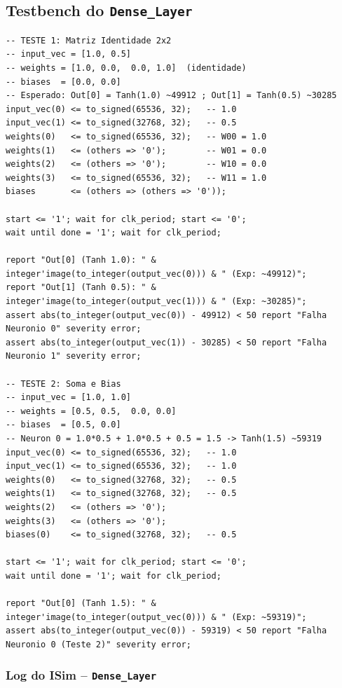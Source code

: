 \documentclass[a4paper,12pt]{article}
\begin{document}
\subsection{Testbench do \texttt{Dense\_Layer}}

\begin{lstlisting}[style=vhdlstyle,
    caption={Testbench do \texttt{Dense\_Layer} -- dois casos de valida\c{c}\~ao.},
    label={lst:tb_dense}]
-- TESTE 1: Matriz Identidade 2x2
-- input_vec = [1.0, 0.5]
-- weights = [1.0, 0.0,  0.0, 1.0]  (identidade)
-- biases  = [0.0, 0.0]
-- Esperado: Out[0] = Tanh(1.0) ~49912 ; Out[1] = Tanh(0.5) ~30285
input_vec(0) <= to_signed(65536, 32);   -- 1.0
input_vec(1) <= to_signed(32768, 32);   -- 0.5
weights(0)   <= to_signed(65536, 32);   -- W00 = 1.0
weights(1)   <= (others => '0');        -- W01 = 0.0
weights(2)   <= (others => '0');        -- W10 = 0.0
weights(3)   <= to_signed(65536, 32);   -- W11 = 1.0
biases       <= (others => (others => '0'));

start <= '1'; wait for clk_period; start <= '0';
wait until done = '1'; wait for clk_period;

report "Out[0] (Tanh 1.0): " & integer'image(to_integer(output_vec(0))) & " (Exp: ~49912)";
report "Out[1] (Tanh 0.5): " & integer'image(to_integer(output_vec(1))) & " (Exp: ~30285)";
assert abs(to_integer(output_vec(0)) - 49912) < 50 report "Falha Neuronio 0" severity error;
assert abs(to_integer(output_vec(1)) - 30285) < 50 report "Falha Neuronio 1" severity error;

-- TESTE 2: Soma e Bias
-- input_vec = [1.0, 1.0]
-- weights = [0.5, 0.5,  0.0, 0.0]
-- biases  = [0.5, 0.0]
-- Neuron 0 = 1.0*0.5 + 1.0*0.5 + 0.5 = 1.5 -> Tanh(1.5) ~59319
input_vec(0) <= to_signed(65536, 32);   -- 1.0
input_vec(1) <= to_signed(65536, 32);   -- 1.0
weights(0)   <= to_signed(32768, 32);   -- 0.5
weights(1)   <= to_signed(32768, 32);   -- 0.5
weights(2)   <= (others => '0');
weights(3)   <= (others => '0');
biases(0)    <= to_signed(32768, 32);   -- 0.5

start <= '1'; wait for clk_period; start <= '0';
wait until done = '1'; wait for clk_period;

report "Out[0] (Tanh 1.5): " & integer'image(to_integer(output_vec(0))) & " (Exp: ~59319)";
assert abs(to_integer(output_vec(0)) - 59319) < 50 report "Falha Neuronio 0 (Teste 2)" severity error;
\end{lstlisting}

\subsubsection{Log do ISim -- \texttt{Dense\_Layer}}
\end{document}
